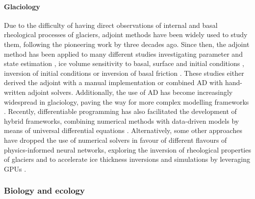 \paragraph{Glaciology}

Due to the difficulty of having direct observations of internal and basal rheological processes of glaciers, adjoint methods have been widely used to study them, following the pioneering work by \cite{macayeal1992basal} three decades ago. 
Since then, the adjoint method has been applied to many different studies investigating parameter and state estimation \cite{goldberg2013parameter}, ice volume sensitivity to basal, surface and initial conditions \cite{heimbach2009greenland}, inversion of initial conditions \cite{mosbeux2016comparison} or inversion of basal friction \cite{morlighem2013inversion}.
These studies either derived the adjoint with a manual implementation or combined AD with hand-written adjoint solvers. 
Additionally, the use of AD has become increasingly widespread in glaciology, paving the way for more complex modelling frameworks \cite{hascoet2018source, Gaikwad.2023}. 
Recently, differentiable programming has also facilitated the development of hybrid frameworks, combining numerical methods with data-driven models by means of universal differential equations \cite{BolibarSapienza_UDEs}. 
Alternatively, some other approaches have dropped the use of numerical solvers in favour of different flavours of physics-informed neural networks, exploring the inversion of rheological properties of glaciers \cite{wang2022discovering} and to accelerate ice thickness inversions and simulations by leveraging GPUs \cite{Jouvet_Cordonnier_Kim_Lüthi_Vieli_Aschwanden_2021, jouvet2023inversion}. 



\subsubsection{Biology and ecology}

